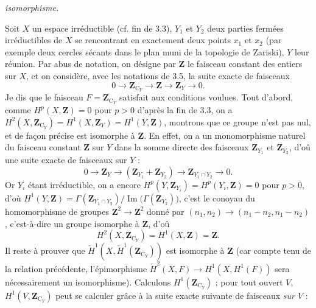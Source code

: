 
\noindent\textit{isomorphisme.}

Soit $X$ un espace irréductible (cf. fin de 3.3), $Y_1$ et $Y_2$ deux parties
fermées irréductibles de $X$ se rencontrant en exactement deux points $x_1$ et
$x_2$ (par exemple deux cercles sécants dans le plan muni de la topologie de
Zariski), $Y$ leur réunion. Par abus de notation, on désigne par $\mathbf Z$ le
faisceau constant des entiers sur $X$, et on considère, avec les notations de
3.5, la suite exacte de faisceaux
\[
0\to\mathbf Z_{\mathrm C_Y}\to\mathbf Z
\to\mathbf Z_Y\to 0.
\]
Je dis que le faisceau $F=\mathbf Z_{\mathrm C_Y}$ satisfait aux conditions voulues.
Tout d'abord, comme $H^p(X,\mathbf Z)=0$ pour $p>0$ d'après la fin de 3.3, on a
$H^2(X,\mathbf Z_{\mathrm C_Y})=H^1(X,\mathbf Z_Y)=H^1(Y,\mathbf Z)$, montrons que ce
groupe n'est pas nul, et de façon précise est isomorphe à $\mathbf Z$. En
effet, on a un monomorphisme naturel du faisceau constant $\mathbf Z$ sur $Y$
dans la somme directe des faisceaux $\mathbf Z_{Y_1}$ et $\mathbf Z_{Y_2}$,
d'oû une suite exacte de faisceaux sur $Y$ :
\[
0\to\mathbf Z_Y
\to(\mathbf Z_{Y_1}+\mathbf Z_{Y_2})
\to\mathbf Z_{Y_1\cap Y_2}\to 0.
\]
Or $Y_i$ étant irréductible, on a encore
$H^p(Y,\mathbf Z_{Y_i})=H^p(Y_i,\mathbf Z)=0$ pour $p>0$, d'où
$H^1(Y,\mathbf Z)
=\Gamma(\mathbf Z_{Y_1\cap Y_2})/
\operatorname{Im}\bigl(\Gamma(\mathbf Z_{Y_2})\bigr)$,
c'est le conoyau du homomorphisme de groupes
$\mathbf Z^2\to\mathbf Z^2$ donné par
$(n_1,n_2)\to(n_1-n_2,n_1-n_2)$, c'est-à-dire un groupe isomorphe à
$\mathbf Z$, d'oû
\[
H^2(X,\mathbf Z_{\mathrm C_Y})=H^1(X,\mathbf Z)=\mathbf Z.
\]
Il reste à prouver que
$\check H^1(X,\check H^1(\mathbf Z_{\mathrm C_Y}))$ est isomorphe à $\mathbf Z$ (car
compte tenu de la relation précédente, l'épimorphisme
$\check H^2(X,F)\to H^1(X,H^1(F))$ sera nécessairement un
isomorphisme). Calculons $H^1(\mathbf Z_{\mathrm C_Y})$ ; pour tout ouvert $V$,
$H^1(V,\mathbf Z_{\mathrm C_Y})$ peut se calculer grâce à la suite exacte suivante de
faisceaux \emph{sur $V$} :
